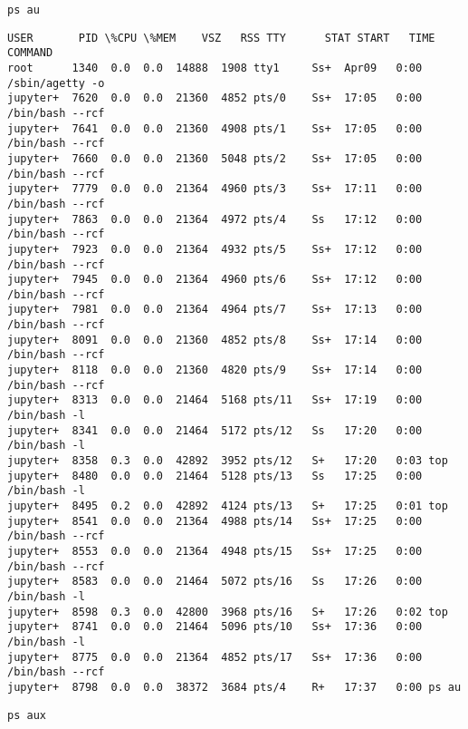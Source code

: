\documentclass[11pt]{article}
\makeatletter
\newcommand{\boxspacing}{\kern\kvtcb@left@rule\kern\kvtcb@boxsep}
\newcommand{\prompt}[4]{
        \ttfamily\llap{{\color{#2}[#3]:\hspace{3pt}#4}}\vspace{-\baselineskip}
    }
\makeatother
\begin{document}
    \begin{tcolorbox}[breakable, size=fbox, boxrule=1pt, pad at break*=1mm,colback=cellbackground, colframe=cellborder]
\prompt{In}{incolor}{4}{\boxspacing}
\begin{Verbatim}[commandchars=\\\{\}]
ps au
\end{Verbatim}
\end{tcolorbox}

    \begin{Verbatim}[commandchars=\\\{\}]
USER       PID \%CPU \%MEM    VSZ   RSS TTY      STAT START   TIME COMMAND
root      1340  0.0  0.0  14888  1908 tty1     Ss+  Apr09   0:00 /sbin/agetty -o
jupyter+  7620  0.0  0.0  21360  4852 pts/0    Ss+  17:05   0:00 /bin/bash --rcf
jupyter+  7641  0.0  0.0  21360  4908 pts/1    Ss+  17:05   0:00 /bin/bash --rcf
jupyter+  7660  0.0  0.0  21360  5048 pts/2    Ss+  17:05   0:00 /bin/bash --rcf
jupyter+  7779  0.0  0.0  21364  4960 pts/3    Ss+  17:11   0:00 /bin/bash --rcf
jupyter+  7863  0.0  0.0  21364  4972 pts/4    Ss   17:12   0:00 /bin/bash --rcf
jupyter+  7923  0.0  0.0  21364  4932 pts/5    Ss+  17:12   0:00 /bin/bash --rcf
jupyter+  7945  0.0  0.0  21364  4960 pts/6    Ss+  17:12   0:00 /bin/bash --rcf
jupyter+  7981  0.0  0.0  21364  4964 pts/7    Ss+  17:13   0:00 /bin/bash --rcf
jupyter+  8091  0.0  0.0  21360  4852 pts/8    Ss+  17:14   0:00 /bin/bash --rcf
jupyter+  8118  0.0  0.0  21360  4820 pts/9    Ss+  17:14   0:00 /bin/bash --rcf
jupyter+  8313  0.0  0.0  21464  5168 pts/11   Ss+  17:19   0:00 /bin/bash -l
jupyter+  8341  0.0  0.0  21464  5172 pts/12   Ss   17:20   0:00 /bin/bash -l
jupyter+  8358  0.3  0.0  42892  3952 pts/12   S+   17:20   0:03 top
jupyter+  8480  0.0  0.0  21464  5128 pts/13   Ss   17:25   0:00 /bin/bash -l
jupyter+  8495  0.2  0.0  42892  4124 pts/13   S+   17:25   0:01 top
jupyter+  8541  0.0  0.0  21364  4988 pts/14   Ss+  17:25   0:00 /bin/bash --rcf
jupyter+  8553  0.0  0.0  21364  4948 pts/15   Ss+  17:25   0:00 /bin/bash --rcf
jupyter+  8583  0.0  0.0  21464  5072 pts/16   Ss   17:26   0:00 /bin/bash -l
jupyter+  8598  0.3  0.0  42800  3968 pts/16   S+   17:26   0:02 top
jupyter+  8741  0.0  0.0  21464  5096 pts/10   Ss+  17:36   0:00 /bin/bash -l
jupyter+  8775  0.0  0.0  21364  4852 pts/17   Ss+  17:36   0:00 /bin/bash --rcf
jupyter+  8798  0.0  0.0  38372  3684 pts/4    R+   17:37   0:00 ps au
    \end{Verbatim}

    \begin{tcolorbox}[breakable, size=fbox, boxrule=1pt, pad at break*=1mm,colback=cellbackground, colframe=cellborder]
\prompt{In}{incolor}{5}{\boxspacing}
\begin{Verbatim}[commandchars=\\\{\}]
ps aux
\end{Verbatim}
\end{tcolorbox}
\end{document}
